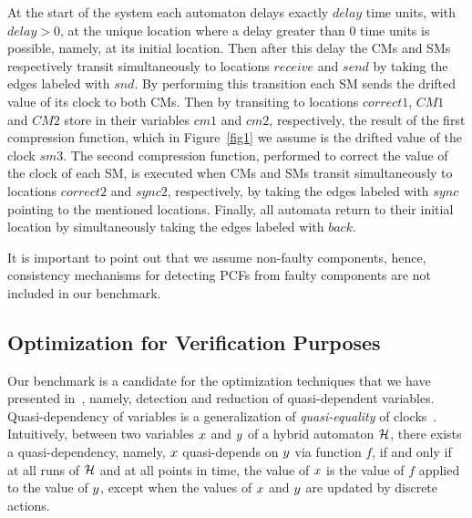 At the start of the system each automaton delays exactly $\mathit{delay}$ time units, 
with $\mathit{delay}>0$, at the unique location where a delay greater than 0 time units is possible, namely, at 
its initial location. Then after this delay 
the CMs and SMs respectively transit simultaneously to locations $\mathit{receive}$ and 
$\mathit{send}$ by taking the edges labeled with $\mathit{snd}$.
By performing this transition each SM sends the drifted value of its clock to both CMs. 
Then by transiting to locations $\mathit{correct1}$, $\mathit{CM1}$ and $\mathit{CM2}$ store in their variables $\mathit{cm1}$
and $\mathit{cm2}$, respectively, the result of the first compression function, which in Figure~\ref{fig1}
we assume is the drifted value of the clock $\mathit{sm3}$. 
The second compression function, performed to correct the value of the clock of each SM, 
is executed when CMs and SMs transit simultaneously to locations
$\mathit{correct2}$ and $\mathit{sync2}$, respectively, by taking the edges labeled with $\mathit{sync}$ pointing to the 
mentioned locations.
Finally, all automata return to their initial location by simultaneously taking the 
edges labeled with $\mathit{back}$.

It is important to point out that we assume non-faulty components, hence, 
consistency mechanisms for detecting PCFs from faulty components are not included in our benchmark.

\subsection{Optimization for Verification Purposes}

Our benchmark is a candidate for the optimization techniques that we have presented in~\cite{Herrera3}, namely,
detection and reduction of quasi-dependent variables. Quasi-dependency of variables is a generalization 
of \emph{quasi-equality} of clocks~\cite{Herrera,Herrera2,Herrera4}. Intuitively, between two variables $x$ and $y$ 
of a hybrid automaton $\mathcal{H}$, there exists a quasi-dependency, namely, $x$ quasi-depends
on $y$ via function $f$, if and only if at all runs of $\mathcal{H}$ and at all points in time,
the value of $x$ is the value of $f$ applied to the value of $y$, except when the values of $x$ and 
$y$ are updated by discrete actions. 

